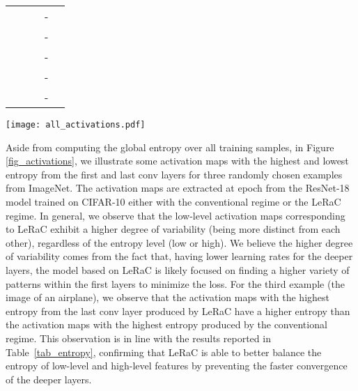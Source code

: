 \documentclass[10pt,twocolumn,letterpaper]{article}
\begin{document}
\begin{table*}[t]
{\begin{center}
\begin{tabular}{lllcc}
     &     &                     & - &    \\
    &     &                     & - &    \\
     &     &                     & - &    \\
      &     &                     & - &    \\
       &     &                     & - &    \\
    \bottomrule
  \end{tabular}
    \end{center}
    }
      \vspace{-0.6cm}
    \caption{Average accuracy rates (in \%) over 5 runs for ResNet-18 and Wide-ResNet-50 on CIFAR-100, as well as SepTr on CREMA-D, based on different ranges for the initial learning rates. The accuracy rates surpassing the baseline training regime are highlighted in bold.}
  \label{tab_various_ranges}
\end{table*}

\begin{figure*}[!t]
\begin{center}
\centerline{\texttt{[image: all\_activations.pdf]}}
\vspace{-0.25cm}
\caption{Activation maps with low and high entropy from the first and last conv layers of ResNet-18 trained on CIFAR-10 for  epochs with the conventional (baseline) and LeRaC (ours) regimes. The input images are taken from ImageNet. Best viewed in color.}
\label{fig_activations}
\vspace{-0.9cm}
\end{center}
\end{figure*}

Aside from computing the global entropy over all training samples, in Figure \ref{fig_activations}, we illustrate some activation maps with the highest and lowest entropy from the first and last conv layers for three randomly chosen examples from ImageNet. The activation maps are extracted at epoch  from the ResNet-18 model trained on CIFAR-10 either with the conventional regime or the LeRaC regime. In general, we observe that the low-level activation maps corresponding to LeRaC exhibit a higher degree of variability (being more distinct from each other), regardless of the entropy level (low or high). We believe the higher degree of variability comes from the fact that, having lower learning rates for the deeper layers, the model based on LeRaC is likely focused on finding a higher variety of patterns within the first layers to minimize the loss. For the third example (the image of an airplane), we observe that the activation maps with the highest entropy from the last conv layer produced by LeRaC have a higher entropy than the activation maps with the highest entropy produced by the conventional regime. This observation is in line with the results reported in Table~\ref{tab_entropy}, confirming that LeRaC is able to better balance the entropy of low-level and high-level features by preventing the faster convergence of the deeper layers. 
\end{document}
